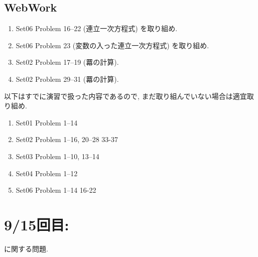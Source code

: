 \subsection{WebWork}
\begin{enumerate}
\item Set06 Problem 16--22 (連立一次方程式) を取り組め.
\item Set06 Problem 23 (変数の入った連立一次方程式) を取り組め.
\item Set02 Problem 17--19 (羃の計算).
\item Set02 Problem 29--31 (羃の計算).
\end{enumerate}
以下はすでに演習で扱った内容であるので,
まだ取り組んでいない場合は適宜取り組め.
\begin{enumerate}
\item Set01 Problem 1--14
\item Set02 Problem 1--16, 20--28  33-37
\item Set03 Problem 1--10, 13--14
\item Set04 Problem 1--12
\item Set06 Problem 1--14 16-22
\end{enumerate}


\newpage
\section{9/15回目: }
に関する問題.
